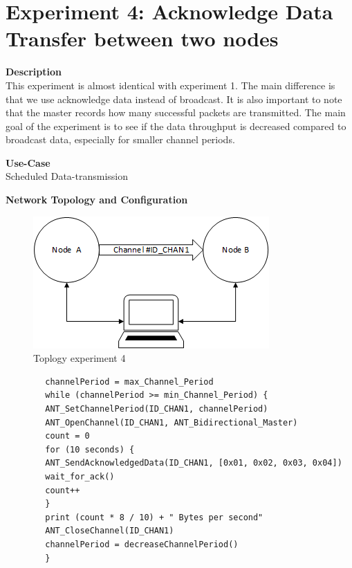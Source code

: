 \section{Experiment 4: Acknowledge Data Transfer between two nodes}
\begin{description} 
	\item{\textbf{Description}} \hfill \\ This experiment is almost identical with experiment 1. The main difference is that we use acknowledge data instead of broadcast. It is also important to note that the master records how many successful packets are transmitted. The main goal of the experiment is to see if the data throughput is decreased compared to broadcast data, especially for smaller channel periods.
	\item{\textbf{Use-Case}} \hfill \\ Scheduled Data-transmission
	\item{\textbf{Network Topology and Configuration}} \hfill \\
	\begin{figure}[h]
		\centering
		\includegraphics[scale=1]{content/images/exp_topo.png}
		\caption{Toplogy experiment 4}
	\end{figure}
	\begin{code}[h]
		\begin{verbatim}
		channelPeriod = max_Channel_Period
		while (channelPeriod >= min_Channel_Period) {
		ANT_SetChannelPeriod(ID_CHAN1, channelPeriod)
		ANT_OpenChannel(ID_CHAN1, ANT_Bidirectional_Master)
		count = 0
		for (10 seconds) {
		ANT_SendAcknowledgedData(ID_CHAN1, [0x01, 0x02, 0x03, 0x04])	   
		wait_for_ack()
		count++
		}
		print (count * 8 / 10) + " Bytes per second"	  
		ANT_CloseChannel(ID_CHAN1)
		channelPeriod = decreaseChannelPeriod()
		} 
		\end{verbatim}
		\caption{Acknowledge data transfer (Master)}\label{lst:mExp4}
	\end{code}
	

\end{description}

